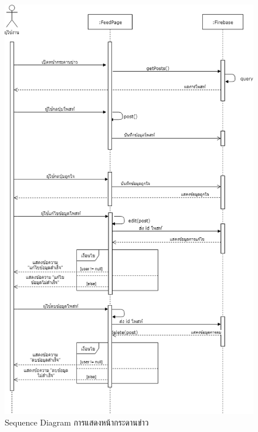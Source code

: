 \begin{figure}[H]
	\centering
	\includegraphics[width=1.\columnwidth]
	{Figures/3/Sequence/feed}
	\caption{Sequence Diagram การแสดงหน้ากระดานข่าว}
	\label{Fig:Sequence-feed}
\end{figure}
\newpage

